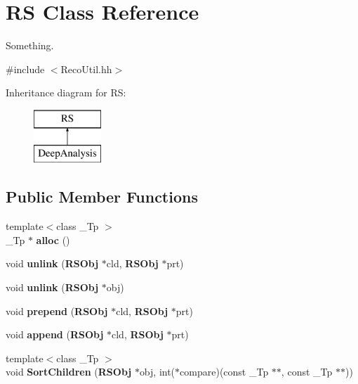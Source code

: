 \section{R\-S Class Reference}
\label{classRS}


Something.  




{\ttfamily \#include $<$Reco\-Util.\-hh$>$}

Inheritance diagram for R\-S\-:\begin{figure}[H]
\begin{center}
\leavevmode
\includegraphics[height=2.000000cm]{classRS}
\end{center}
\end{figure}
\subsection*{Public Member Functions}
\begin{DoxyCompactItemize}
\item 
{\footnotesize template$<$class \-\_\-\-Tp $>$ }\\\-\_\-\-Tp $\ast$ {\bfseries alloc} ()\label{classRS_ab925a56657936bf58fa0b572a4d55c85}

\item 
void {\bfseries unlink} ({\bf R\-S\-Obj} $\ast$cld, {\bf R\-S\-Obj} $\ast$prt)\label{classRS_add62222b166ede30bc242cf115059409}

\item 
void {\bfseries unlink} ({\bf R\-S\-Obj} $\ast$obj)\label{classRS_af0e279ecf61559bc9719285a2a8fef0b}

\item 
void {\bfseries prepend} ({\bf R\-S\-Obj} $\ast$cld, {\bf R\-S\-Obj} $\ast$prt)\label{classRS_a0135830c1eef7c9c8666fc5ee98e5b2b}

\item 
void {\bfseries append} ({\bf R\-S\-Obj} $\ast$cld, {\bf R\-S\-Obj} $\ast$prt)\label{classRS_a1d9b09c9ad252a5211efe8009c205ac8}

\item 
{\footnotesize template$<$class \-\_\-\-Tp $>$ }\\void {\bfseries Sort\-Children} ({\bf R\-S\-Obj} $\ast$obj, int($\ast$compare)(const \-\_\-\-Tp $\ast$$\ast$, const \-\_\-\-Tp $\ast$$\ast$))\label{classRS_ac24a5fbd83218e4195bf359ffb15686d}

\end{DoxyCompactItemize}
